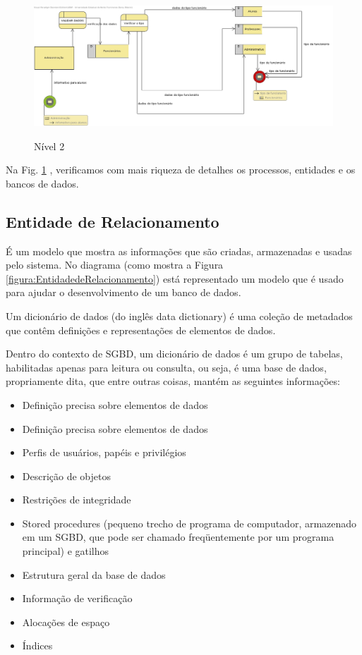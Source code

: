                 
                  
               \begin{figure}[H]
               \caption{Nível 2}
               \centering %
                \includegraphics[width=13cm]{analisedeProjeto/Nivel2} %
                \label{figura:Nivel2}
                \end{figure}
                Na Fig. \ref{figura:Nivel2} , verificamos com mais riqueza de detalhes os processos, entidades e os bancos de dados.
             
                

\subsection{Entidade de Relacionamento}
É um modelo que mostra as informações que são criadas, armazenadas e usadas pelo sistema.
No diagrama (como mostra a Figura  \ref{figura:EntidadedeRelacionamento}) está representado um modelo que é usado para ajudar o desenvolvimento de um banco de dados.
 
 Um dicionário de dados (do inglês data dictionary) é uma coleção de metadados que contêm definições e representações de elementos de dados.

Dentro do contexto de SGBD, um dicionário de dados é um grupo de tabelas, habilitadas apenas para leitura ou consulta, ou seja, é uma base de dados, propriamente dita, que entre outras coisas, mantém as seguintes informações:

\begin{itemize}
 \item Definição precisa sobre elementos de dados
 \item Definição precisa sobre elementos de dados
 \item Perfis de usuários, papéis e privilégios
 \item Descrição de objetos
 \item Restrições de integridade
  \item Stored procedures (pequeno trecho de programa de computador, armazenado em um SGBD, que pode ser chamado freqüentemente por um programa principal) e gatilhos
  \item Estrutura geral da base de dados
  \item Informação de verificação
  \item Alocações de espaço
  \item Índices
\end{itemize}

